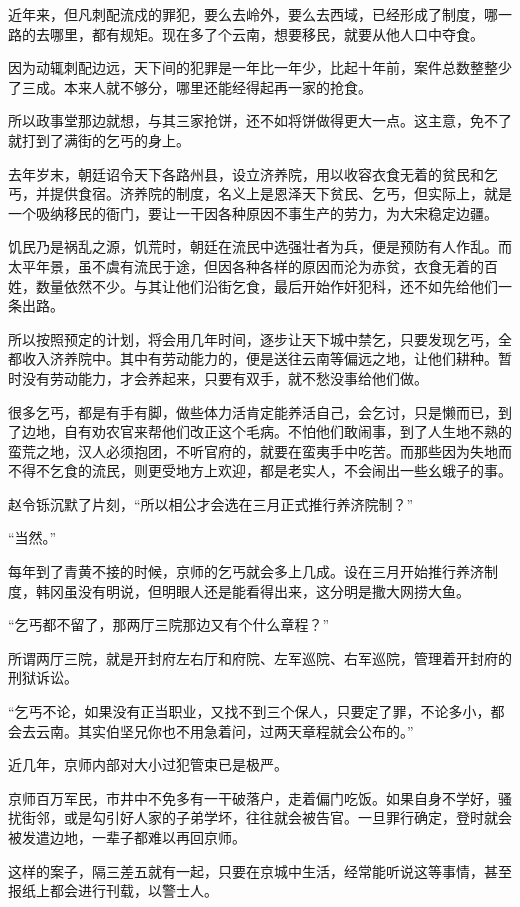 近年来，但凡刺配流戍的罪犯，要么去岭外，要么去西域，已经形成了制度，哪一路的去哪里，都有规矩。现在多了个云南，想要移民，就要从他人口中夺食。

因为动辄刺配边远，天下间的犯罪是一年比一年少，比起十年前，案件总数整整少了三成。本来人就不够分，哪里还能经得起再一家的抢食。

所以政事堂那边就想，与其三家抢饼，还不如将饼做得更大一点。这主意，免不了就打到了满街的乞丐的身上。

去年岁末，朝廷诏令天下各路州县，设立济养院，用以收容衣食无着的贫民和乞丐，并提供食宿。济养院的制度，名义上是恩泽天下贫民、乞丐，但实际上，就是一个吸纳移民的衙门，要让一干因各种原因不事生产的劳力，为大宋稳定边疆。

饥民乃是祸乱之源，饥荒时，朝廷在流民中选强壮者为兵，便是预防有人作乱。而太平年景，虽不虞有流民于途，但因各种各样的原因而沦为赤贫，衣食无着的百姓，数量依然不少。与其让他们沿街乞食，最后开始作奸犯科，还不如先给他们一条出路。

所以按照预定的计划，将会用几年时间，逐步让天下城中禁乞，只要发现乞丐，全都收入济养院中。其中有劳动能力的，便是送往云南等偏远之地，让他们耕种。暂时没有劳动能力，才会养起来，只要有双手，就不愁没事给他们做。

很多乞丐，都是有手有脚，做些体力活肯定能养活自己，会乞讨，只是懒而已，到了边地，自有劝农官来帮他们改正这个毛病。不怕他们敢闹事，到了人生地不熟的蛮荒之地，汉人必须抱团，不听官府的，就要在蛮夷手中吃苦。而那些因为失地而不得不乞食的流民，则更受地方上欢迎，都是老实人，不会闹出一些幺蛾子的事。

赵令铄沉默了片刻，“所以相公才会选在三月正式推行养济院制？”

“当然。”

每年到了青黄不接的时候，京师的乞丐就会多上几成。设在三月开始推行养济制度，韩冈虽没有明说，但明眼人还是能看得出来，这分明是撒大网捞大鱼。

“乞丐都不留了，那两厅三院那边又有个什么章程？”

所谓两厅三院，就是开封府左右厅和府院、左军巡院、右军巡院，管理着开封府的刑狱诉讼。

“乞丐不论，如果没有正当职业，又找不到三个保人，只要定了罪，不论多小，都会去云南。其实伯坚兄你也不用急着问，过两天章程就会公布的。”

近几年，京师内部对大小过犯管束已是极严。

京师百万军民，市井中不免多有一干破落户，走着偏门吃饭。如果自身不学好，骚扰街邻，或是勾引好人家的子弟学坏，往往就会被告官。一旦罪行确定，登时就会被发遣边地，一辈子都难以再回京师。

这样的案子，隔三差五就有一起，只要在京城中生活，经常能听说这等事情，甚至报纸上都会进行刊载，以警士人。

